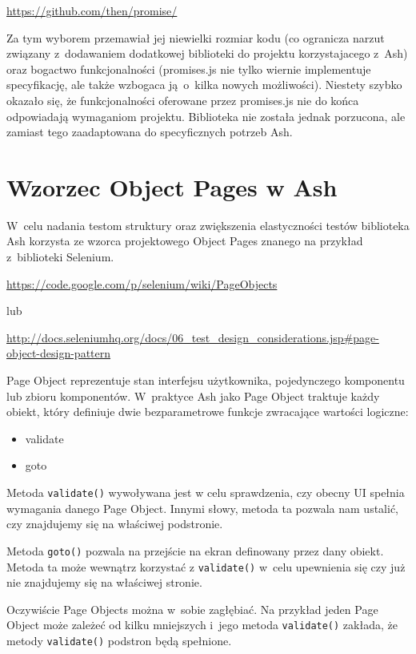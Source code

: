 \documentclass[brudnopis]{xmgr}
\begin{document}
\url{https://github.com/then/promise/}

Za tym wyborem przemawiał jej niewielki rozmiar kodu (co ogranicza narzut związany z~dodawaniem dodatkowej biblioteki do projektu korzystajacego z~Ash) oraz bogactwo funkcjonalności (promises.js nie tylko wiernie implementuje specyfikację, ale także wzbogaca ją~o~kilka nowych możliwości). Niestety szybko okazało się, że funkcjonalności oferowane przez promises.js nie do końca odpowiadają wymaganiom projektu. Biblioteka nie została jednak porzucona, ale zamiast tego zaadaptowana do specyficznych potrzeb Ash.  

\section{Wzorzec Object Pages w Ash}

W~celu nadania testom struktury oraz zwiększenia elastyczności testów biblioteka Ash korzysta ze wzorca projektowego Object Pages znanego na przykład z~biblioteki Selenium. 

\url{https://code.google.com/p/selenium/wiki/PageObjects}

lub

\url{http://docs.seleniumhq.org/docs/06\_test\_design\_considerations.jsp\#page-object-design-pattern}

Page Object reprezentuje stan interfejsu użytkownika, pojedynczego komponentu lub zbioru komponentów. W~praktyce Ash jako Page Object traktuje każdy obiekt, który definiuje dwie bezparametrowe funkcje zwracające wartości logiczne:

\begin{itemize}
  \item validate
  \item goto
\end{itemize}

Metoda \texttt{validate()} wywoływana jest w celu sprawdzenia, czy obecny UI spełnia wymagania danego Page Object. Innymi słowy, metoda ta pozwala nam ustalić, czy znajdujemy się na właściwej podstronie. 

Metoda \texttt{goto()} pozwala na przejście na ekran definowany przez dany obiekt. Metoda ta może wewnątrz korzystać z \texttt{validate()} w~celu upewnienia się czy już nie znajdujemy się na właściwej stronie. 

Oczywiście Page Objects można w~sobie zagłębiać. Na przykład jeden Page Object może zależeć od kilku mniejszych i~jego metoda \texttt{validate()} zakłada, że metody \texttt{validate()} podstron będą spełnione. 
\end{document}
